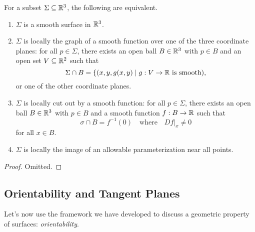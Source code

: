 \documentclass[a4paper]{article}
\begin{document}
\begin{theorem}
    For a subset $\Sigma \subseteq \mathbb{R}^3$, the following are equivalent.
    \begin{enumerate}[label=(\roman*)]
        \item $\Sigma$ is a smooth surface in $\mathbb{R}^3$.
        \item $\Sigma$ is locally the graph of a smooth function over one of the three coordinate planes: for all $p \in \Sigma$, there exists an open ball $B \in \mathbb{R}^3$ with $p \in B$ and an open set $V \subseteq \mathbb{R}^2$ such that
        $$
        \Sigma \cap B = \{(x, y, g(x, y) \mid g : V \rightarrow \mathbb{R} \text{ is smooth}),
        $$
        or one of the other coordinate planes.
    \item $\Sigma$ is locally cut out by a smooth function: for all $p \in \Sigma$, there exists an open ball $B \in \mathbb{R}^3$ with $p \in B$ and a smooth function $f:B \rightarrow \mathbb{R}$ such that
    $$
        \sigma \cap B = f^{-1}(0) \quad \text{where} \quad \left.Df\right|_x \neq 0
    $$
    for all $x \in B$.
    \item $\Sigma$ is locally the image of an allowable parameterization near all points.
    \end{enumerate}
\end{theorem}
\begin{proof}
    Omitted.
\end{proof}


\subsection{Orientability and Tangent Planes}

Let's now use the framework we have developed to discuss a geometric property of surfaces: \emph{orientability}.
\end{document}
